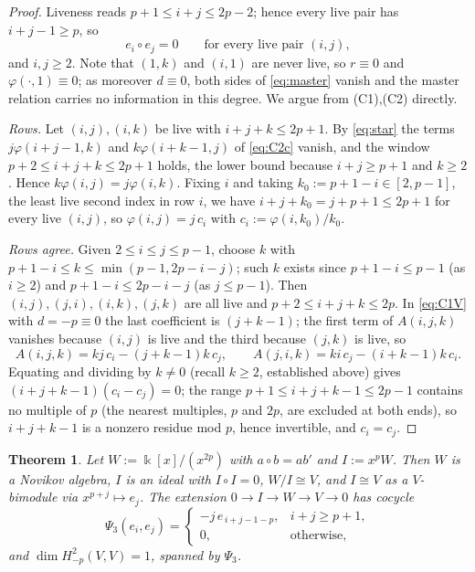 \documentclass[11pt,reqno]{amsart}
\theoremstyle{plain}
\newtheorem{theorem}{Theorem}[section]
\theoremstyle{definition}
\newcommand{\kk}{\Bbbk}
\newcommand{\Ht}{H^2}
\begin{document}
\begin{proof}
Liveness reads $p+1\le i+j\le2p-2$; hence every live pair has $i+j-1\ge p$, so
\begin{equation}
e_i\circ e_j=0\qquad\text{for every live pair }(i,j),
\label{eq:star}
\end{equation}
and $i,j\ge2$. Note that $(1,k)$ and $(i,1)$ are never live, so $r\equiv0$ and
$\varphi(\cdot,1)\equiv0$; as moreover $d\equiv0$, both sides of \eqref{eq:master} vanish
and the master relation carries no information in this degree. We argue from (C1),(C2)
directly.

\emph{Rows.} Let $(i,j),(i,k)$ be live with $i+j+k\le2p+1$. By \eqref{eq:star} the terms
$j\varphi(i+j-1,k)$ and $k\varphi(i+k-1,j)$ of \eqref{eq:C2c} vanish, and the window
$p+2\le i+j+k\le2p+1$ holds, the lower bound because $i+j\ge p+1$ and $k\ge2$. Hence
$k\varphi(i,j)=j\varphi(i,k)$. Fixing $i$ and taking $k_0:=p+1-i\in[2,p-1]$, the least live
second index in row $i$, we have $i+j+k_0=j+p+1\le2p+1$ for every live $(i,j)$, so
$\varphi(i,j)=j\,c_i$ with $c_i:=\varphi(i,k_0)/k_0$.

\emph{Rows agree.} Given $2\le i\le j\le p-1$, choose $k$ with
$p+1-i\le k\le\min(p-1,2p-i-j)$; such $k$ exists since $p+1-i\le p-1$ (as $i\ge2$) and
$p+1-i\le2p-i-j$ (as $j\le p-1$). Then $(i,j),(j,i),(i,k),(j,k)$ are all live and
$p+2\le i+j+k\le2p$. In \eqref{eq:C1V} with $d=-p\equiv0$ the last coefficient is $(j+k-1)$;
the first term of $A(i,j,k)$ vanishes because $(i,j)$ is live and the third because $(j,k)$
is live, so
\[
A(i,j,k)=kj\,c_i-(j+k-1)k\,c_j,\qquad A(j,i,k)=ki\,c_j-(i+k-1)k\,c_i .
\]
Equating and dividing by $k\ne0$ (recall $k\ge2$, established above) gives
$(i+j+k-1)(c_i-c_j)=0$; the range $p+1\le i+j+k-1\le2p-1$ contains no multiple of $p$ (the
nearest multiples, $p$ and $2p$, are excluded at both ends), so $i+j+k-1$ is a nonzero
residue mod $p$, hence invertible, and $c_i=c_j$.
\end{proof}

\begin{theorem}\label{thm:psi3}
Let $W:=\kk[x]/(x^{2p})$ with $a\circ b=ab'$ and $I:=x^pW$. Then $W$ is a Novikov algebra,
$I$ is an ideal with $I\circ I=0$, $W/I\cong V$, and $I\cong V$ as a $V$-bimodule via
$x^{p+j}\mapsto e_j$. The extension $0\to I\to W\to V\to0$ has cocycle
\[
\Psi_3(e_i,e_j)=\begin{cases}-j\,e_{\,i+j-1-p}, & i+j\ge p+1,\\ 0,&\text{otherwise,}\end{cases}
\]
and $\dim\Ht_{-p}(V,V)=1$, spanned by $\Psi_3$.
\end{theorem}
\end{document}
